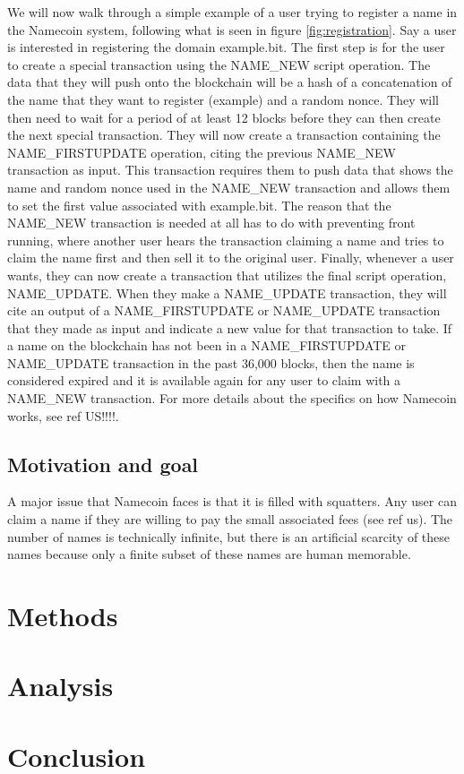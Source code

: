 \documentclass{article} %
\begin{document}
    We will now walk through a simple example of a user trying to register a name in the Namecoin system, following what is seen in figure \ref{fig:registration}. Say a user is interested in registering the domain example.bit. The first step is for the user to create a special transaction using the NAME\_NEW script operation. The data that they will push onto the blockchain will be a hash of a concatenation of the name that they want to register (example) and a random nonce. They will then need to wait for a period of at least 12 blocks before they can then create the next special transaction. They will now create a transaction containing the NAME\_FIRSTUPDATE operation, citing the previous NAME\_NEW transaction as input. This transaction requires them to push data that shows the name and random nonce used in the NAME\_NEW transaction and allows them to set the first value associated with example.bit. The reason that the NAME\_NEW transaction is needed at all has to do with preventing front running, where another user hears the transaction claiming a name and tries to claim the name first and then sell it to the original user. Finally, whenever a user wants, they can now create a transaction that utilizes the final script operation, NAME\_UPDATE. When they make a NAME\_UPDATE transaction, they will cite an output of a NAME\_FIRSTUPDATE or NAME\_UPDATE transaction that they made as input and indicate a new value for that transaction to take. If a name on the blockchain has not been in a NAME\_FIRSTUPDATE or NAME\_UPDATE transaction in the past 36,000 blocks, then the name is considered expired and it is available again for any user to claim with a NAME\_NEW transaction. For more details about the specifics on how Namecoin works, see {ref US!!!!}.

\subsection{Motivation and goal}

    A major issue that Namecoin faces is that it is filled with squatters. Any user can claim a name if they are willing to pay the small associated fees (see {ref us}). The number of names is technically infinite, but there is an artificial scarcity of these names because only a finite subset of these names are human memorable. 


\section{Methods}
 
\section{Analysis}


\section{Conclusion}

\newpage
\printbibliography
\end{document}
